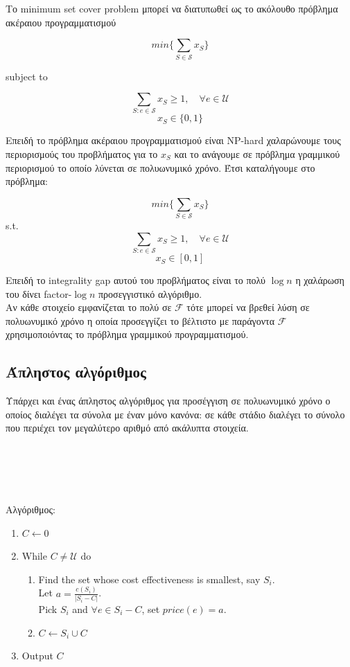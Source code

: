 Το minimum set cover problem μπορεί να διατυπωθεί ως το ακόλουθο πρόβλημα ακέραιου προγραμματισμού


$$min\{\displaystyle\sum_{S\in{\mathcal{S}}} x_S\}$$ 
\centerline{subject to}
$$\displaystyle\sum_{S:e\in{\mathcal{S}}} x_S \geq{1}, \quad \forall e \in{\mathcal{U}}$$
$$ x_S \in{\{0, 1\}}$$

Επειδή το πρόβλημα ακέραιου προγραμματισμού είναι NP-hard χαλαρώνουμε τους περιορισμούς του προβλήματος για το $x_S$ και το ανάγουμε σε πρόβλημα γραμμικού περιορισμού το οποίο λύνεται σε πολυωνυμικό χρόνο. Έτσι καταλήγουμε στο πρόβλημα:

$$min\{\displaystyle\sum_{S\in{\mathcal{S}}} x_S\}$$ s.t.
$$\displaystyle\sum_{S:e\in{\mathcal{S}}} x_S \geq{1}, \quad \forall e \in{\mathcal{U}}$$
$$ x_S \in{[0, 1]}$$

Επειδή το integrality gap αυτού του προβλήματος είναι το πολύ $\log{n}$ η χαλάρωση του δίνει factor-$\log{n}$ προσεγγιστικό αλγόριθμο.
\\
Αν κάθε στοιχείο εμφανίζεται το πολύ σε ${\mathcal{F}}$ τότε μπορεί να βρεθεί λύση σε πολυωνυμικό χρόνο η οποία προσεγγίζει το βέλτιστο με παράγοντα ${\mathcal{F}}$ χρησιμοποιόντας το πρόβλημα γραμμικού προγραμματισμού.

\subsection{Άπληστος αλγόριθμος} 

Υπάρχει και ένας άπληστος αλγόριθμος για προσέγγιση σε πολυωνυμικό χρόνο ο οποίος διαλέγει τα σύνολα με έναν μόνο κανόνα: σε κάθε στάδιο διαλέγει το σύνολο που περιέχει τον μεγαλύτερο αριθμό από ακάλυπτα στοιχεία.
\\
\\
\\
\\
\\
\\
Αλγόριθμος:
\begin{enumerate}
\item $ C \leftarrow 0$
\item While $ C \neq {\mathcal{U}} $ do
\begin{enumerate}
\item Find the set whose cost effectiveness is smallest, say $S_i$. \\
			Let $a = \frac{c(S_i)}{|S_i-C|}$. \\
			Pick $S_i$ and $\forall e \in{S_i - C}$, set $price(e) = a$.
\item $C \leftarrow S_i \cup C$
\end{enumerate}
\item Output $C$
\end{enumerate}

